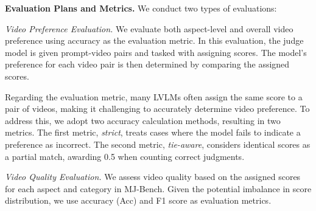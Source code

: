 


\textbf{Evaluation Plans and Metrics.} We conduct two types of evaluations:


\noindent \textit{Video Preference Evaluation.} We evaluate both aspect-level and overall video preference using accuracy as the evaluation metric. In this evaluation, the judge model is given prompt-video pairs and tasked with assigning scores. The model's preference for each video pair is then determined by comparing the assigned scores.

Regarding the evaluation metric, many LVLMs often assign the same score to a pair of videos, making it challenging to accurately determine video preference. To address this, we adopt two accuracy calculation methods, resulting in two metrics. The first metric, \textit{strict}, treats cases where the model fails to indicate a preference as incorrect. The second metric, \textit{tie-aware}, considers identical scores as a partial match, awarding 0.5 when counting correct judgments.

\noindent \textit{Video Quality Evaluation.} We assess video quality based on the assigned scores for each aspect and category in MJ-Bench. Given the potential imbalance in score distribution, we use accuracy (Acc) and F1 score as evaluation metrics.








